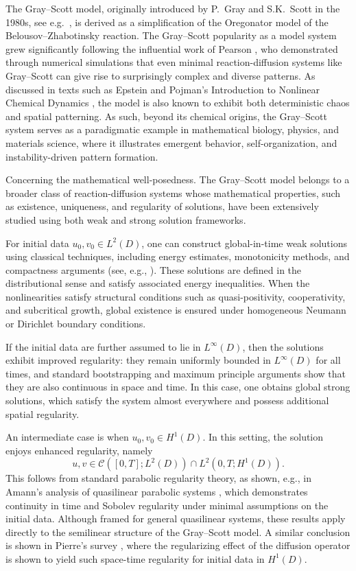 \documentclass[11pt, a4paper]{amsart}
\newcommand{\mC}{\mathcal{C}}
\numberwithin{equation}{section}
\begin{document}
	The Gray--Scott model, originally introduced by P.\ Gray and S.K.\ Scott in the 1980s, see e.g.\ \cite{gray1983autocatalytic}, is derived as a simplification of the Oregonator model of the Belousov--Zhabotinsky reaction. The Gray--Scott popularity as a model system grew significantly following the influential work of Pearson \cite{pearson1993complex}, who demonstrated through numerical simulations that even minimal reaction-diffusion systems like Gray--Scott can give rise to surprisingly complex and diverse patterns. As discussed in texts such as Epstein and Pojman's Introduction to Nonlinear Chemical Dynamics \cite{epstein1998introduction}, the model is also known to exhibit both deterministic chaos and spatial patterning.
	As such, beyond its chemical origins, the Gray--Scott system serves as a paradigmatic example in mathematical biology, physics, and materials science, where it illustrates emergent behavior, self-organization, and instability-driven pattern formation.
	
	Concerning the mathematical well-posedness. The Gray--Scott model belongs to a broader class of reaction-diffusion systems whose mathematical properties, such as existence, uniqueness, and regularity of solutions, have been extensively studied using both weak and strong solution frameworks.
	
	For initial data $u_0,v_0\in L^2(D)$, one can construct global-in-time weak solutions using classical techniques, including energy estimates, monotonicity methods, and compactness arguments (see, e.g., \cite{amann1989dynamic, pierre2010global}). These solutions are defined in the distributional sense and satisfy associated energy inequalities. When the nonlinearities satisfy structural conditions such as quasi-positivity, cooperativity, and subcritical growth, global existence is ensured under homogeneous Neumann or Dirichlet boundary conditions.
	
	If the initial data are further assumed to lie in $L^\infty(D)$, then the solutions exhibit improved regularity: they remain uniformly bounded in $L^\infty(D)$ for all times, and standard bootstrapping and maximum principle arguments show that they are also continuous in space and time. In this case, one obtains global strong solutions, which satisfy the system almost everywhere and possess additional spatial regularity.
	
	An intermediate case is when $u_0,v_0\in H^1(D)$. In this setting, the solution enjoys enhanced regularity, namely
	\[
	u, v \in \mC([0,T];L^2(D)) \cap L^2(0,T;H^1(D)).
	\]
	This follows from standard parabolic regularity theory, as shown, e.g., in Amann's analysis of quasilinear parabolic systems \cite[Theorem 2.1]{amann1989dynamic}, which demonstrates continuity in time and Sobolev regularity under minimal assumptions on the initial data. Although framed for general quasilinear systems, these results apply directly to the semilinear structure of the Gray--Scott model. A similar conclusion is shown in Pierre's survey \cite{pierre2010global}, where the regularizing effect of the diffusion operator is shown to yield such space-time regularity for initial data in $H^1(D)$.
	
\end{document}
